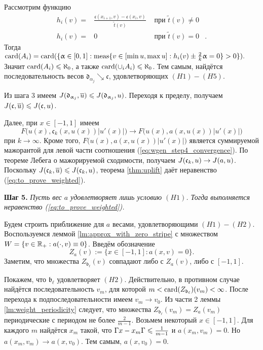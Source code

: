 Рассмотрим функцию
$$
\begin{aligned}
h_i(v) = & \frac{\mathfrak c(x_{i + 1}, v) - \mathfrak c(x_i, v)}{\tilde{t} (v)} & \text{ при } \tilde{t} (v) \neq 0 & \\
h_i(v) = & 0 & \text{ при } \tilde{t} (v) = 0 &.
\end{aligned}
$$
Тогда $\card(A_i) = \card(\{ \alpha \in [0, 1]: \meas \{ v \in [\min u, \max u]: h_i(v) \pm \frac{2}{k} \alpha = 0 \} > 0 \}).$
Значит $\operatorname{card}(A_i) \leqslant \aleph_0$, а также $\operatorname{card}(\cup_i A_i) \leqslant \aleph_0$.
Тем самым, найдётся последовательность весов $\mathfrak d_{\alpha_j} \searrow \mathfrak c$, удовлетворяющих $(H1)-(H5)$.

Из шага 3 имеем $\IWg(\mathfrak d_{\alpha_j}, \mon{u}) \le \IWg(\mathfrak d_{\alpha_j}, u)$.
Переходя к пределу, получаем $\IWg(\mathfrak c, \mon{u}) \le \IWg(\mathfrak c, u)$.

Далее, при $x \in [-1, 1]$ имеем
\begin{equation}
\label{eq:wgen_step4_convergence}
F \bigl( u(x), \mathfrak c_k(x, u(x)) |u'(x)| \bigr) \to F \bigl( u(x), a(x, u(x)) |u'(x)| \bigr)
\end{equation}
при $k \to \infty$.
Кроме того, $F \bigl( u(x), a(x, u(x)) |u'(x)| \bigr)$ является суммируемой мажорантой для левой части соотношения (\ref{eq:wgen_step4_convergence}).
По теореме Лебега о мажорируемой сходимости, получаем $J(\mathfrak c_k, u) \to J(a, u)$.
Поскольку $\IWg(\mathfrak c_k, \mon{u}) \le \IWg(\mathfrak c_k, u)$, теорема \ref{thm:uplift} даёт неравенство (\ref{eq:to_prove_weighted}).

\bigskip
\textbf{Шаг 5.}
\textit{Пусть вес $a$ удовлетворяет лишь условию $(H1)$.
Тогда выполняется неравенство (\ref{eq:to_prove_weighted}).}

Будем строить приближение для $a$ весами, удовлетворяющими $(H1)-(H2)$.
Воспользуемся леммой \ref{lm:approx_with_zero_stripe} с множеством $W = \{ v \in \mathbb R_+: a(\cdot, v) \equiv 0 \}$.
Введём обозначение
$$
Z_a(v) := \{ x \in [-1, 1]: a(x, v) = 0 \}.
$$
Заметим, что множества $Z_{\mathfrak b_{\ell}}(v)$ совпадают либо с $Z_{a}(v)$, либо с $[-1, 1]$.

Покажем, что  $\mathfrak b_{\ell}$ удовлетворяет $(H2)$.
Действительно, в противном случае найдётся последовательность $v_m$, для которой
$m < \operatorname{card}(Z_{\mathfrak b_{\ell}})(v_m) < \infty$.
После перехода к подпоследовательности имеем $v_m \to v_0$.
Из части 2 леммы \ref{lm:weight_periodicity} следует,
что множества $Z_{\mathfrak b_{\ell}}(v_m) = Z_{a}(v_m)$ периодические с периодом не более $\frac{2}{m - 1}$.
Возьмем некоторый $x \in [-1, 1]$.
Для каждого $m$ найдётся $x_m$ такой, что
$\abs{x - x_m} \le \frac{1}{m - 1}$ и $a(x_m, v_m) = 0$.
Но $a(x_m, v_m) \to a(x, v_0)$.
Тем самым, $a(x, v_0) = 0$.

